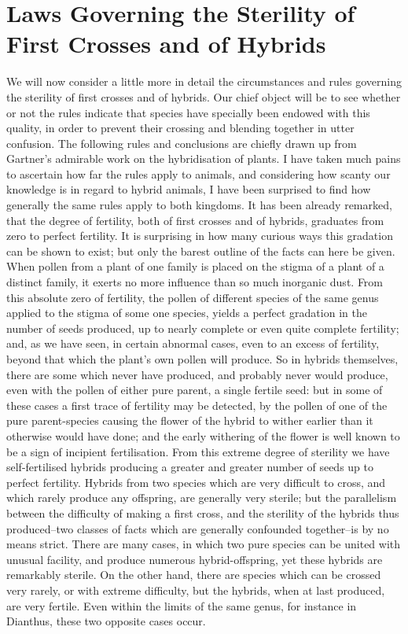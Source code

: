 \section{Laws Governing the Sterility of First Crosses and of Hybrids}
We will now consider a little more in detail the circumstances and rules governing the sterility of first crosses and of hybrids. Our chief object will be to see whether or not the rules indicate that species have specially been endowed with this quality, in order to prevent their crossing and blending together in utter confusion. The following rules and conclusions are chiefly drawn up from Gartner's admirable work on the hybridisation of plants. I have taken much pains to ascertain how far the rules apply to animals, and considering how scanty our knowledge is in regard to hybrid animals, I have been surprised to find how generally the same rules apply to both kingdoms.
It has been already remarked, that the degree of fertility, both of first crosses and of hybrids, graduates from zero to perfect fertility. It is surprising in how many curious ways this gradation can be shown to exist; but only the barest outline of the facts can here be given. When pollen from a plant of one family is placed on the stigma of a plant of a distinct family, it exerts no more influence than so much inorganic dust. From this absolute zero of fertility, the pollen of different species of the same genus applied to the stigma of some one species, yields a perfect gradation in the number of seeds produced, up to nearly complete or even quite complete fertility; and, as we have seen, in certain abnormal cases, even to an excess of fertility, beyond that which the plant's own pollen will produce. So in hybrids themselves, there are some which never have produced, and probably never would produce, even with the pollen of either pure parent, a single fertile seed: but in some of these cases a first trace of fertility may be detected, by the pollen of one of the pure parent-species causing the flower of the hybrid to wither earlier than it otherwise would have done; and the early withering of the flower is well known to be a sign of incipient fertilisation. From this extreme degree of sterility we have self-fertilised hybrids producing a greater and greater number of seeds up to perfect fertility.
Hybrids from two species which are very difficult to cross, and which rarely produce any offspring, are generally very sterile; but the parallelism between the difficulty of making a first cross, and the sterility of the hybrids thus produced--two classes of facts which are generally confounded together--is by no means strict. There are many cases, in which two pure species can be united with unusual facility, and produce numerous hybrid-offspring, yet these hybrids are remarkably sterile. On the other hand, there are species which can be crossed very rarely, or with extreme difficulty, but the hybrids, when at last produced, are very fertile. Even within the limits of the same genus, for instance in Dianthus, these two opposite cases occur.
